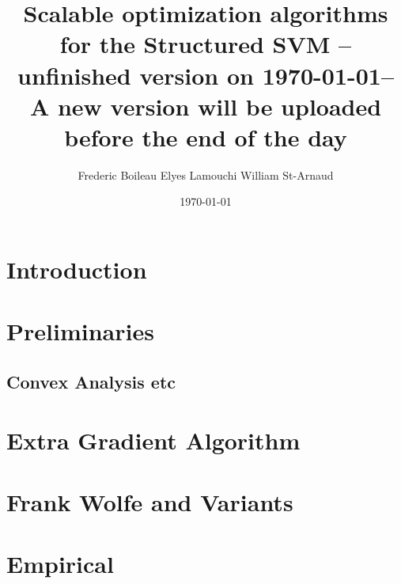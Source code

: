 

\usepackage[
  backend=biber,
  citestyle=authoryear-ibid,
  natbib=true
  ]{biblatex}
\usepackage{csquotes}
\usepackage{fancyhdr}
\pagestyle{fancyplain}
\fancyhf{}
\rhead{ \fancyplain{}{\today} }
\rfoot{ \fancyplain{}{\thepage} }

\renewcommand\nameyeardelim{, }



\title{Scalable optimization algorithms for the Structured SVM -- unfinished
  version on \today  -- A new version will be uploaded before the end of the day}
\date{\today}
\author{Frederic Boileau Elyes Lamouchi William St-Arnaud}

\maketitle

\clearpage
\section{Introduction}



\clearpage
\section{Preliminaries}

% 

\clearpage
\subsection{Convex Analysis etc}


\clearpage
\section{Extra Gradient Algorithm}


\clearpage
\section{Frank Wolfe and Variants}


\clearpage
\section{Empirical}


